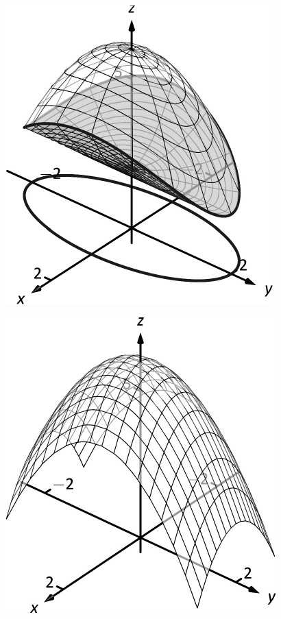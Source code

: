 \documentclass[10pt]{article}
\begin{document}
\includegraphics{figtrip5_3DBW.pdf}
\texttt{}

\includegraphics{figtrip5b_3DBW.pdf}
\texttt{}
\end{document}
